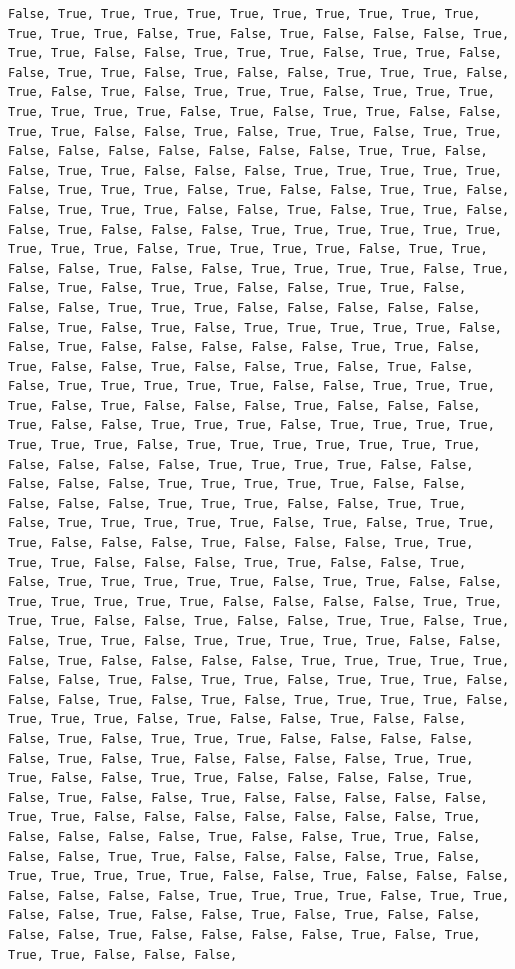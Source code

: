 \documentclass[
  letterpaper,
  DIV=11,
  numbers=noendperiod]{scrartcl}
\begin{document}
\begin{verbatim}
False, True, True, True, True, True, True, True, True, True, True, True, True, True, False, True, False, True, False, False, False, True, True, True, False, False, True, True, True, False, True, True, False, False, True, True, False, True, False, False, True, True, True, False, True, False, True, False, True, True, True, False, True, True, True, True, True, True, True, False, True, False, True, True, False, False, True, True, False, False, True, False, True, True, False, True, True, False, False, False, False, False, False, False, True, True, False, False, True, True, False, False, False, True, True, True, True, True, False, True, True, True, False, True, False, False, True, True, False, False, True, True, True, False, False, True, False, True, True, False, False, True, False, False, False, True, True, True, True, True, True, True, True, True, False, True, True, True, True, False, True, True, False, False, True, False, False, True, True, True, True, False, True, False, True, False, True, True, False, False, True, True, False, False, False, True, True, True, False, False, False, False, False, False, True, False, True, False, True, True, True, True, True, False, False, True, False, False, False, False, False, True, True, False, True, False, False, True, False, False, True, False, True, False, False, True, True, True, True, True, False, False, True, True, True, True, False, True, False, False, False, True, False, False, False, True, False, False, True, True, True, False, True, True, True, True, True, True, True, False, True, True, True, True, True, True, True, False, False, False, False, True, True, True, True, False, False, False, False, False, True, True, True, True, True, False, False, False, False, False, True, True, True, False, False, True, True, False, True, True, True, True, True, False, True, False, True, True, True, False, False, False, True, False, False, False, True, True, True, True, False, False, False, True, True, False, False, True, False, True, True, True, True, True, False, True, True, False, False, True, True, True, True, True, False, False, False, False, True, True, True, True, False, False, True, False, False, True, True, False, True, False, True, True, False, True, True, True, True, True, False, False, False, True, False, False, False, False, True, True, True, True, True, False, False, True, False, True, True, False, True, True, True, False, False, False, True, False, True, False, True, True, True, True, False, True, True, True, False, True, False, False, True, False, False, False, True, False, True, True, True, False, False, False, False, False, True, False, True, False, False, False, False, True, True, True, False, False, True, True, False, False, False, False, True, False, True, False, False, True, False, False, False, False, False, True, True, False, False, False, False, False, False, False, True, False, False, False, False, True, False, False, True, True, False, False, False, True, True, False, False, False, False, True, False, True, True, True, True, True, False, False, True, False, False, False, False, False, False, False, True, True, True, True, False, True, True, False, False, True, False, False, True, False, True, False, False, False, False, True, False, False, False, False, True, False, True, True, True, False, False, False, 
\end{verbatim}
\end{document}
